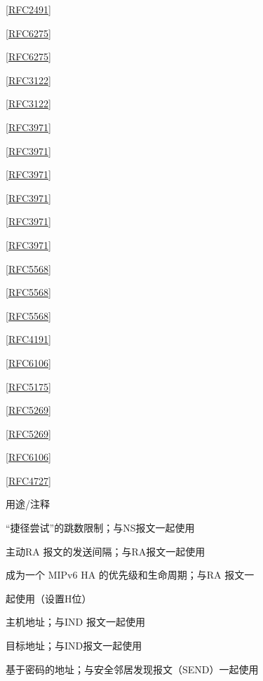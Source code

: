 \href{https://www.rfc-editor.org/rfc/rfc2491}{[RFC2491]}

\href{https://www.rfc-editor.org/rfc/rfc6275}{[RFC6275]}

\href{https://www.rfc-editor.org/rfc/rfc6275}{[RFC6275]}

\href{https://www.rfc-editor.org/rfc/rfc3122}{[RFC3122]}

\href{https://www.rfc-editor.org/rfc/rfc3122}{[RFC3122]}

\href{https://www.rfc-editor.org/rfc/rfc3971}{[RFC3971]}

\href{https://www.rfc-editor.org/rfc/rfc3971}{[RFC3971]}

\href{https://www.rfc-editor.org/rfc/rfc3971}{[RFC3971]}

\href{https://www.rfc-editor.org/rfc/rfc3971}{[RFC3971]}

\href{https://www.rfc-editor.org/rfc/rfc3971}{[RFC3971]}

\href{https://www.rfc-editor.org/rfc/rfc3971}{[RFC3971]}

\href{https://www.rfc-editor.org/rfc/rfc5568}{[RFC5568]}

\href{https://www.rfc-editor.org/rfc/rfc5568}{[RFC5568]}

\href{https://www.rfc-editor.org/rfc/rfc5568}{[RFC5568]}

\href{https://www.rfc-editor.org/rfc/rfc4191}{[RFC4191]}

\href{https://www.rfc-editor.org/rfc/rfc6106}{[RFC6106]}

\href{https://www.rfc-editor.org/rfc/rfc5175}{[RFC5175]}

\href{https://www.rfc-editor.org/rfc/rfc5269}{[RFC5269]}

\href{https://www.rfc-editor.org/rfc/rfc5269}{[RFC5269]}

\href{https://www.rfc-editor.org/rfc/rfc6106}{[RFC6106]}

\href{https://www.rfc-editor.org/rfc/rfc4727}{[RFC4727]}

用途/注释

“捷径尝试”的跳数限制；与NS报文一起使用

主动RA 报文的发送间隔；与RA报文一起使用

成为一个 MIPv6 HA 的优先级和生命周期；与RA 报文一

起使用（设置H位）

主机地址；与IND 报文一起使用

目标地址；与IND报文一起使用

基于密码的地址；与安全邻居发现报文（SEND）一起使用

